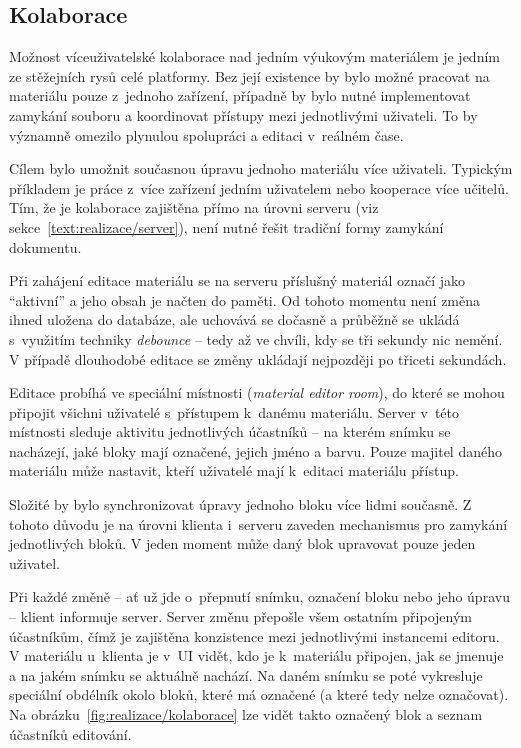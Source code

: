 \subsection{Kolaborace}

Možnost víceuživatelské kolaborace nad jedním výukovým materiálem je jedním ze stěžejních rysů celé platformy.
Bez její existence by bylo možné pracovat na materiálu pouze z~jednoho zařízení, případně by bylo nutné implementovat zamykání souboru a koordinovat přístupy mezi jednotlivými uživateli. 
To by významně omezilo plynulou spolupráci a editaci v~reálném čase.

Cílem bylo umožnit současnou úpravu jednoho materiálu více uživateli. 
Typickým příkladem je práce z~více zařízení jedním uživatelem nebo kooperace více učitelů. 
Tím, že je kolaborace zajištěna přímo na úrovni serveru (viz sekce~\ref{text:realizace/server}), není nutné řešit tradiční formy zamykání dokumentu.

Při zahájení editace materiálu se na serveru příslušný materiál označí jako \enquote{aktivní} a jeho obsah je načten do paměti. 
Od tohoto momentu není změna ihned uložena do databáze, ale uchovává se dočasně a průběžně se ukládá s~využitím techniky \textit{debounce} -- tedy až ve chvíli, kdy se tři sekundy nic nemění. 
V případě dlouhodobé editace se změny ukládají nejpozději po třiceti sekundách.

Editace probíhá ve speciální místnosti (\textit{material editor room}), do které se mohou připojit všichni uživatelé s~přístupem k~danému materiálu. 
Server v~této místnosti sleduje aktivitu jednotlivých účastníků -- na kterém snímku se nacházejí, jaké bloky mají označené, jejich jméno a barvu. 
Pouze majitel daného materiálu může nastavit, kteří uživatelé mají k~editaci materiálu přístup.

Složité by bylo synchronizovat úpravy jednoho bloku více lidmi současně.
Z tohoto důvodu je na úrovni klienta i~serveru zaveden mechanismus pro zamykání jednotlivých bloků.
V jeden moment může daný blok upravovat pouze jeden uživatel.

Při každé změně -- ať už jde o~přepnutí snímku, označení bloku nebo jeho úpravu -- klient informuje server. 
Server změnu přepošle všem ostatním připojeným účastníkům, čímž je zajištěna konzistence mezi jednotlivými instancemi editoru.
V materiálu u~klienta je v~UI vidět, kdo je k~materiálu připojen, jak se jmenuje a na jakém snímku se aktuálně nachází.
Na daném snímku se poté vykresluje speciální obdélník okolo bloků, které má označené (a které tedy nelze označovat).
Na obrázku~\ref{fig:realizace/kolaborace} lze vidět takto označený blok a seznam účastníků editování.



